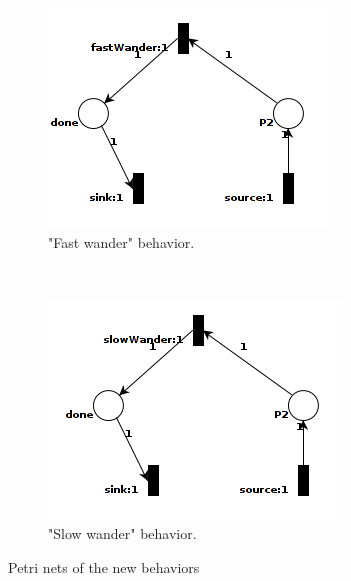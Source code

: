 \documentclass[11pt]{book}
\begin{document}
\begin{figure}
        \centering
        \begin{subfigure}[b]{0.5\textwidth}
                \includegraphics[width=\textwidth]{fastWanderSituation}
                \caption{"Fast wander" behavior.}
                \label{fig:fastWanderPetrinet}
        \end{subfigure}%
        ~ %
        \begin{subfigure}[b]{0.5\textwidth}
                \includegraphics[width=\textwidth]{slowWanderSituation}
                \caption{"Slow wander" behavior.}
                \label{fig:slowWanderPetrinet}
        \end{subfigure}
        \caption{Petri nets of the new behaviors}\label{fig:newSituations}
\end{figure}
\end{document}
